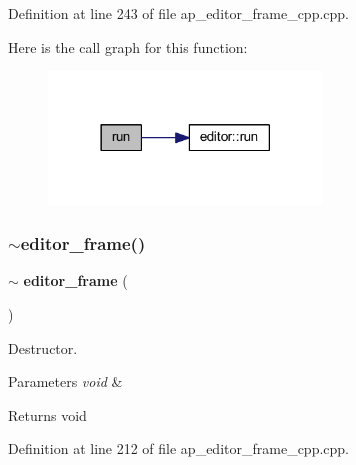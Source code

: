 Definition at line 243 of file ap\+\_\+editor\+\_\+frame\+\_\+cpp.\+cpp.

Here is the call graph for this function\+:
\nopagebreak
\begin{figure}[H]
\begin{center}
\leavevmode
\includegraphics[width=206pt]{group___script__editor_ga7f023340b8930afdb091542b289c015b_cgraph}
\end{center}
\end{figure}
\mbox{\label{group___script__editor_ga2360d5b02430388c93b937744b123bf7}} 
\subsubsection{$\sim$editor\_frame()}
{\footnotesize\ttfamily $\sim$\textbf{ editor\+\_\+frame} (\begin{DoxyParamCaption}{ }\end{DoxyParamCaption})\hspace{0.3cm}{\ttfamily [virtual]}}



Destructor. 


\begin{DoxyParams}{Parameters}
{\em void} & \\
\hline
\end{DoxyParams}
\begin{DoxyReturn}{Returns}
void 
\end{DoxyReturn}


Definition at line 212 of file ap\+\_\+editor\+\_\+frame\+\_\+cpp.\+cpp.

